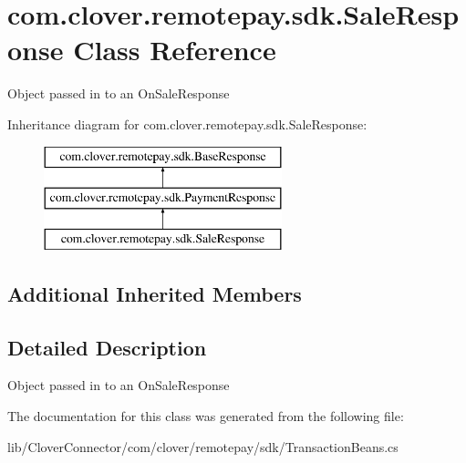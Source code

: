 \hypertarget{classcom_1_1clover_1_1remotepay_1_1sdk_1_1_sale_response}{}\section{com.\+clover.\+remotepay.\+sdk.\+Sale\+Response Class Reference}
\label{classcom_1_1clover_1_1remotepay_1_1sdk_1_1_sale_response}


Object passed in to an On\+Sale\+Response  


Inheritance diagram for com.\+clover.\+remotepay.\+sdk.\+Sale\+Response\+:\begin{figure}[H]
\begin{center}
\leavevmode
\includegraphics[height=3.000000cm]{classcom_1_1clover_1_1remotepay_1_1sdk_1_1_sale_response}
\end{center}
\end{figure}
\subsection*{Additional Inherited Members}


\subsection{Detailed Description}
Object passed in to an On\+Sale\+Response 



The documentation for this class was generated from the following file\+:\begin{DoxyCompactItemize}
\item 
lib/\+Clover\+Connector/com/clover/remotepay/sdk/Transaction\+Beans.\+cs\end{DoxyCompactItemize}
